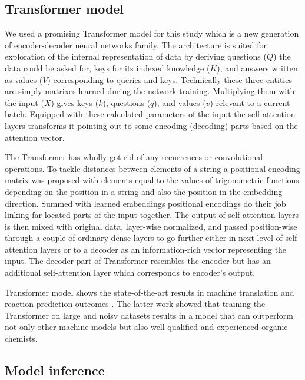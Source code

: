 \documentclass{article}
\begin{document}
\subsection{Transformer model}
We used a promising Transformer \cite{Transformer} model for this study which is a new generation of encoder-decoder neural networks family. The architecture is suited for exploration of the internal representation of data by deriving questions ($Q$) the data could be asked for, keys for its indexed knowledge ($K$), and answers written as values ($V$) corresponding to queries and keys. Technically these three entities are simply matrixes learned during the network training. Multiplying them with the input ($X$) gives keys ($k$), questions ($q$), and values ($v$) relevant to a current batch. Equipped with these calculated parameters of the input the self-attention layers transforms it pointing out to some encoding (decoding) parts based on the attention vector. 

The Transformer has wholly got rid of any recurrences or convolutional operations. To tackle distances between elements of a string a positional encoding matrix was proposed with elements equal to the values of trigonometric functions depending on the position in a string and also the position in the embedding direction. Summed with learned embeddings positional encodings do their job linking far located parts of the input together. The output of self-attention layers is then mixed with original data, layer-wise normalized, and passed position-wise through a couple of ordinary dense layers to go further either in next level of self-attention layers or to a decoder as an information-rich vector representing the input. The decoder part of Transformer resembles the encoder but has an additional self-attention layer which corresponds to encoder's output. 

Transformer model shows the state-of-the-art results in machine translation and reaction prediction outcomes \cite{SchwallerTransformer}. The latter work showed that training the Transformer on large and noisy datasets results in a model that can outperform not only other machine models but also well qualified and experienced organic chemists. 

\subsection{Model inference}
\end{document}
